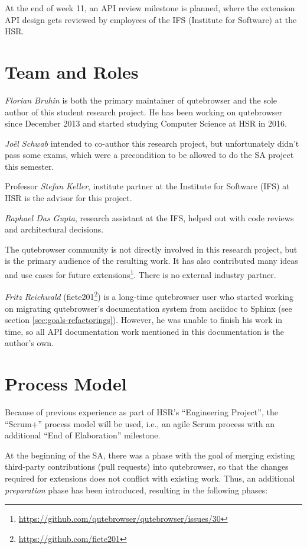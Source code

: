 At the end of week 11, an API review milestone is planned, where the extension
API design gets reviewed by employees of the IFS (Institute for Software) at the
HSR.

\section{Team and Roles}
\label{sec:team}
\emph{Florian Bruhin} is both the primary maintainer of qutebrowser and the
sole author of this student research project. He has been working on qutebrowser since
December 2013 and started studying Computer Science at HSR in 2016.

\emph{Joël Schwab} intended to co-author this research project, but
unfortunately didn't pass some exams, which were a precondition to be allowed to
do the SA project this semester.

Professor \emph{Stefan Keller}, institute partner at the Institute for Software
(IFS) at HSR is the advisor for this project.

\emph{Raphael Das Gupta}, research assistant at the IFS, helped out with code
reviews and architectural decisions.

The qutebrowser community is not directly involved in this research project, but
is the primary audience of the resulting work. It has also contributed many
ideas and use cases for future
extensions\footnote{\url{https://github.com/qutebrowser/qutebrowser/issues/30}}.
There is no external industry partner.

\label{fiete}
\emph{Fritz Reichwald} (fiete201\footnote{\url{https://github.com/fiete201}})
is a long-time qutebrowser user who started working on migrating qutebrowser's
documentation system from asciidoc to Sphinx (see section
\ref{sec:goals-refactorings}). However, he was unable to finish his work in
time, so all API documentation work mentioned in this documentation is the
author's own.

\section{Process Model}
Because of previous experience as part of HSR's ``Engineering Project'', the
``Scrum+'' process model will be used, i.e., an agile Scrum process with an
additional ``End of Elaboration'' milestone.

At the beginning of the SA, there was a phase with the goal of merging existing
third-party contributions (pull requests) into qutebrowser, so that the changes
required for extensions does not conflict with existing work. Thus, an additional
\emph{preparation} phase has been introduced, resulting in the following phases:

